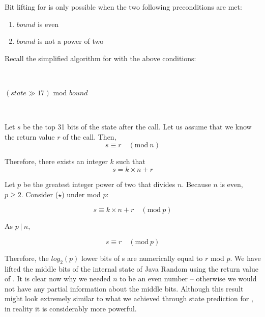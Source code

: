 \documentclass{article}
\begin{document}
Bit lifting for  is only possible when the two following preconditions are met:
\begin{enumerate}
    \item $bound$ is even
    \item $bound$ is not a power of two
\end{enumerate}

\noindent Recall the simplified algorithm for  with the above conditions:

\
\begin{algorithmic}
    \State \Return $(state \gg 17)$ mod $bound$
\EndFunction
\end{algorithmic}
\ \

Let $s$ be the top 31 bits of the state after the  call. Let us assume that we know the return value $r$ of the  call. Then,
\begin{equation}
    s \equiv r \quad (\text{mod} \ n)
\end{equation}

\noindent Therefore, there exists an integer $k$ such that
\begin{equation}\tag{$\star$}
     s = k \times n + r
\end{equation}

\noindent Let $p$ be the greatest integer power of two that divides $n$. Because $n$ is even, $p \ge 2$. Consider ($\star$) under mod $p$:

\begin{equation}
     s \equiv k \times n + r \quad (\text{mod} \ p)
\end{equation}

\noindent As $p \ | \ n$,

\begin{equation}\label{lifting.core}\tag{$\star\star$}
     s \equiv r \quad (\text{mod} \ p)
\end{equation}

Therefore, the $log_2(p)$ lower bits of s are numerically equal to $r$ mod $p$. We have lifted the middle bits of the internal state of Java Random using the return value of . It is clear now why we needed $n$ to be an even number -- otherwise we would not have any partial information about the middle bits.
Although this result might look extremely similar to what we achieved through state prediction for \Call{nextInt}{$2^n$}, in reality it is considerably more powerful.
\end{document}
